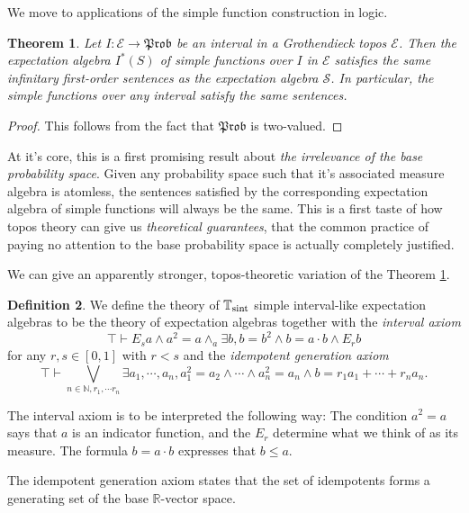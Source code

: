 \documentclass[a4paper]{amsproc}
\theoremstyle{plain}
\newtheorem{theorem}{Theorem}[section]
\theoremstyle{definition}
\newtheorem{definition}[theorem]{Definition}
\theoremstyle{remark}
\numberwithin{equation}{section}
\newcommand{\Prob}{\mathfrak{Prob}}
\begin{document}
We move to applications of the simple function construction in logic.

\begin{theorem}\label{prob_space_invariance}
    Let $I: \mathcal{E} \to \Prob$ be an interval in a Grothendieck topos $\mathcal{E}$. Then the expectation algebra $I^*(S)$ of simple functions over $I$ in $\mathcal{E}$ satisfies the same infinitary first-order sentences as the expectation algebra $\mathcal{S}$. In particular, the simple functions over any interval satisfy the same sentences.
\end{theorem}
\begin{proof}
    This follows from the fact that $\Prob$ is two-valued.
\end{proof}

At it's core, this is a first promising result about \emph{the irrelevance of the base probability space}. Given any probability space such that it's associated measure algebra is atomless, the sentences satisfied by the corresponding expectation algebra of simple functions will always be the same. This is a first taste of how topos theory can give us \emph{theoretical guarantees}, that the common practice of paying no attention to the base probability space is actually completely justified.

We can give an apparently stronger, topos-theoretic variation of the Theorem \ref{prob_space_invariance}.

\begin{definition}
    We define the theory of $\mathbb{T}_{\textup{sint}}$ simple interval-like expectation algebras to be the theory of expectation algebras together with the \emph{interval axiom}
    \[
        \top \vdash E_s a \wedge a^2 = a \wedge_a \exists b, b = b^2 \wedge b = a \cdot b \wedge E_r b
    \]
    for any $r,s \in [0,1]$ with $r < s$ and the \emph{idempotent generation axiom}
    \[
        \top \vdash \bigvee_{n \in \mathbb{N}, r_1,\cdots r_n} \exists a_1, \cdots, a_n, a_1^2 = a_2 \wedge \cdots \wedge a_n^2 = a_n \wedge b = r_1 a_1 + \cdots + r_n a_n .
    \]
\end{definition}

The interval axiom is to be interpreted the following way: The condition $a^2 = a$ says that $a$ is an indicator function, and the $E_r$ determine what we think of as its measure. The formula $b = a \cdot b$ expresses that $b \le a$.

The idempotent generation axiom states that the set of idempotents forms a generating set of the base $\mathbb{R}$-vector space.
\end{document}
